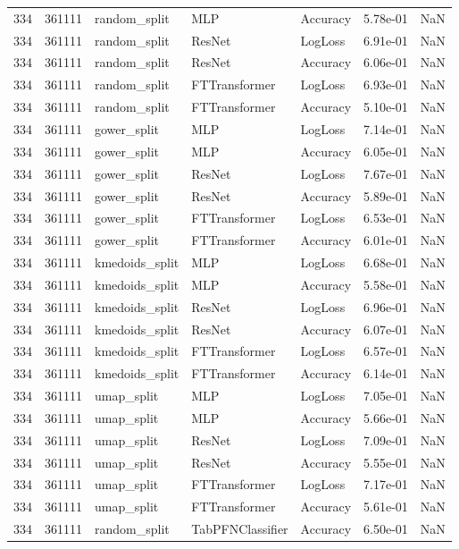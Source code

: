 \begin{tabular}{rrlllrr}
334 & 361111 & random\_split & MLP & Accuracy & 5.78e-01 & NaN \\
334 & 361111 & random\_split & ResNet & LogLoss & 6.91e-01 & NaN \\
334 & 361111 & random\_split & ResNet & Accuracy & 6.06e-01 & NaN \\
334 & 361111 & random\_split & FTTransformer & LogLoss & 6.93e-01 & NaN \\
334 & 361111 & random\_split & FTTransformer & Accuracy & 5.10e-01 & NaN \\
334 & 361111 & gower\_split & MLP & LogLoss & 7.14e-01 & NaN \\
334 & 361111 & gower\_split & MLP & Accuracy & 6.05e-01 & NaN \\
334 & 361111 & gower\_split & ResNet & LogLoss & 7.67e-01 & NaN \\
334 & 361111 & gower\_split & ResNet & Accuracy & 5.89e-01 & NaN \\
334 & 361111 & gower\_split & FTTransformer & LogLoss & 6.53e-01 & NaN \\
334 & 361111 & gower\_split & FTTransformer & Accuracy & 6.01e-01 & NaN \\
334 & 361111 & kmedoids\_split & MLP & LogLoss & 6.68e-01 & NaN \\
334 & 361111 & kmedoids\_split & MLP & Accuracy & 5.58e-01 & NaN \\
334 & 361111 & kmedoids\_split & ResNet & LogLoss & 6.96e-01 & NaN \\
334 & 361111 & kmedoids\_split & ResNet & Accuracy & 6.07e-01 & NaN \\
334 & 361111 & kmedoids\_split & FTTransformer & LogLoss & 6.57e-01 & NaN \\
334 & 361111 & kmedoids\_split & FTTransformer & Accuracy & 6.14e-01 & NaN \\
334 & 361111 & umap\_split & MLP & LogLoss & 7.05e-01 & NaN \\
334 & 361111 & umap\_split & MLP & Accuracy & 5.66e-01 & NaN \\
334 & 361111 & umap\_split & ResNet & LogLoss & 7.09e-01 & NaN \\
334 & 361111 & umap\_split & ResNet & Accuracy & 5.55e-01 & NaN \\
334 & 361111 & umap\_split & FTTransformer & LogLoss & 7.17e-01 & NaN \\
334 & 361111 & umap\_split & FTTransformer & Accuracy & 5.61e-01 & NaN \\
334 & 361111 & random\_split & TabPFNClassifier & Accuracy & 6.50e-01 & NaN \\

\end{tabular}
